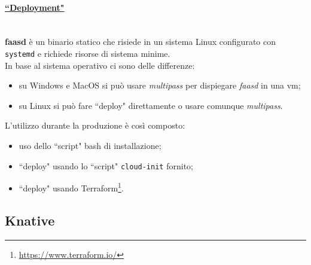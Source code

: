 \documentclass[12pt,a4paper,openany,twoside]{book}
\begin{document}
\paragraph{\underline{``Deployment"}} ~\\
\textbf{faasd} è un binario statico che risiede in un sistema Linux configurato con \texttt{systemd} e richiede risorse di sistema minime.
\\
In base al sistema operativo ci sono delle differenze:
\begin{itemize}
    \item su Windows e MacOS si può usare \textit{multipass} per dispiegare \textit{faasd} in una \ac{vm};
    
    \item su Linux si può fare ``deploy" direttamente o usare comunque \textit{multipass}.
\end{itemize}

\noindent
L'utilizzo durante la produzione è così composto:
\begin{itemize}
    \item uso dello ``script" bash di installazione;
    
    \item ``deploy" usando lo ``script" \texttt{cloud-init} fornito;
    
    \item ``deploy" usando Terraform\footnote{\url{https://www.terraform.io/}}.
\end{itemize}


\subsection{Knative}
\end{document}
